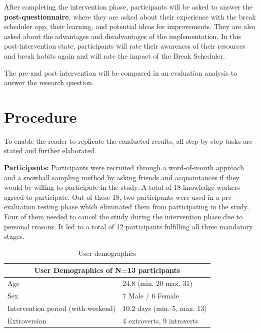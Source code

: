 \documentclass{hasel_thesis}
\begin{document}
After completing the intervention phase, participants will be asked to answer the \textbf{post-questionnaire}, where they are asked about their experience with the break scheduler app, their learning, and potential ideas for improvements. They are also asked about the advantages and disadvantages of the implementation. In this post-intervention state, participants will rate their awareness of their resources and break habits again and will rate the impact of the Break Scheduler.

The pre-and post-intervention will be compared in an evaluation analysis to answer the research question.


\section{Procedure}

To enable the reader to replicate the conducted results, all step-by-step tasks are stated and further elaborated.

\textbf{Participants:} Participants were recruited through a word-of-mouth approach and a snowball sampling method by asking friends and acquaintances if they would be willing to participate in the study. A total of 18 knowledge workers agreed to participate. Out of these 18, two participants were used in a pre-evaluation testing phase which eliminated them from participating in the study. Four of them needed to cancel the study during the intervention phase due to personal reasons. It led to a total of 12 participants fulfilling all three mandatory stages.

\begin{table}[h]
 \caption{User demographics}
    \begin{tabular}{ |p{3cm}||p{3cm}|  }
     \hline
     \multicolumn{2}{|c|}{User Demographics of N=13 participants} \\
    
     \hline
     Age & 24.8 (min. 20 max. 31) \\
     \hline
     Sex &   7 Male / 6 Female \\
     \hline
     Intervention period (with weekend) & 10.2 days (min. 5, max. 13)\\
     \hline
     Extroversion & 4 extroverts, 9 introverts \\
     \hline            
    \end{tabular}
 \label{table:demographics}
\end{table}
\end{document}
